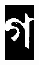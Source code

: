 \documentclass{standalone}
\begin{document}
\begin{figure}
\begin{subfigure}{0.15\textwidth}
  \includegraphics[width=0.8\linewidth]{./img/sample/stage13-3}
\end{subfigure}
\begin{subfigure}{0.15\textwidth}
  \centering

\end{subfigure}
\end{figure}
\end{document}
